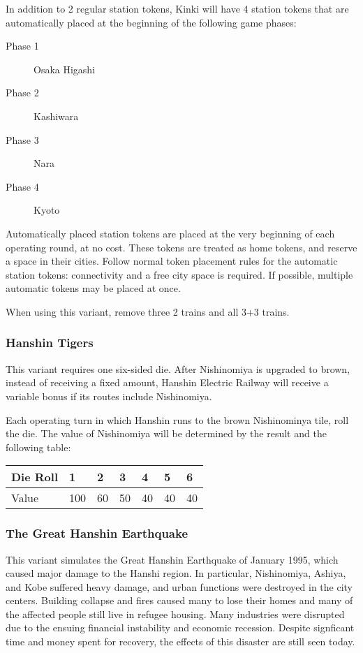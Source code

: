 \documentclass{article}
\begin{document}
\begin{CJK}{UTF8}{min}
\begin{multicols}{2}
In addition to 2 regular station tokens, Kinki will have 4 station
tokens that are automatically placed at the beginning of the following
game phases:

\begin{description}
\item[Phase 1] Osaka Higashi
\item[Phase 2] Kashiwara
\item[Phase 3] Nara
\item[Phase 4] Kyoto
\end{description}

Automatically placed station tokens are placed at the very beginning
of each operating round, at no cost. These tokens are treated as home
tokens, and reserve a space in their cities.  Follow normal token
placement rules for the automatic station tokens: connectivity and a
free city space is required. If possible, multiple automatic tokens
may be placed at once.

When using this variant, remove three 2 trains and all 3+3 trains.

\subsubsection{Hanshin Tigers}
This variant requires one six-sided die. After Nishinomiya is upgraded
to brown, instead of receiving a fixed amount, Hanshin Electric
Railway will receive a variable bonus if its routes include
Nishinomiya.

Each operating turn in which Hanshin runs to the brown Nishinominya
tile, roll the die. The value of Nishinomiya will be determined by the
result and the following table:

\begin{tabular}{l|llllll}
Die Roll & 1 & 2 & 3 & 4 & 5 & 6 \\
\hline
Value & 100 & 60 & 50 & 40 & 40 & 40 \\
\end{tabular}

\subsubsection{The Great Hanshin Earthquake}
This variant simulates the Great Hanshin Earthquake of January 1995,
which caused major damage to the Hanshi region. In particular,
Nishinomiya, Ashiya, and Kobe suffered heavy damage, and urban
functions were destroyed in the city centers. Building collapse and
fires caused many to lose their homes and many of the affected people
still live in refugee housing. Many industries were disrupted due to
the ensuing financial instability and economic recession. Despite
signficant time and money spent for recovery, the effects of this
disaster are still seen today.


\end{multicols}
\end{CJK}
\end{document}
